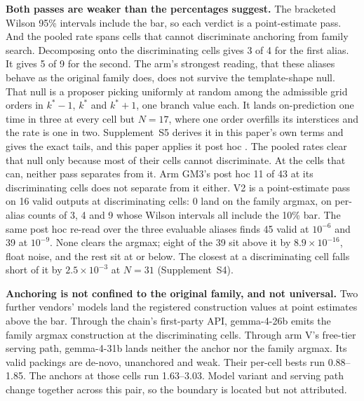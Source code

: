 

\textbf{Both passes are weaker than the percentages suggest.} The
bracketed Wilson 95\% intervals include the bar, so each verdict is a point-estimate pass.
And the pooled rate spans cells that cannot
discriminate anchoring from family search. Decomposing onto the discriminating cells gives 3
of 4 for the first alias. It gives 5 of 9 for the second. The arm's strongest reading, that these aliases behave
as the original family does, does not survive the template-shape null. That null is a proposer
picking uniformly at random among the admissible grid orders in $k^*{-}1$, $k^*$ and $k^*{+}1$,
one branch value each. It lands on-prediction one time in three at every cell but $N = 17$,
where one order overfills its interstices and the rate is one in two. Supplement~S5 derives it in
this paper's own terms and gives the exact tails, and this paper applies it post hoc
\citep{companion}. The pooled rates clear that null only because most of their cells cannot
discriminate. At the cells that can, neither pass separates from it. Arm GM3's
post hoc 11 of 43 at its discriminating cells does not separate from it either. V2 is a point-estimate
pass on 16 valid outputs at discriminating cells: 0 land on the family argmax, on per-alias
counts of 3, 4 and 9 whose Wilson intervals all include the 10\% bar. The same post hoc re-read over the three evaluable aliases
finds 45 valid at $10^{-6}$ and 39 at $10^{-9}$. None clears the argmax; eight of the 39
sit above it by $8.9\times10^{-16}$, float noise, and the rest sit at or below. The closest at
a discriminating cell
falls short of it by $2.5\times10^{-3}$ at $N = 31$ (Supplement~S4).

\textbf{Anchoring is not confined to the original family, and not universal.} Two further
vendors' models land the registered construction values at point estimates above the bar.
Through the chain's first-party API, gemma-4-26b emits the family argmax construction at
the discriminating cells. Through arm V's free-tier serving path, gemma-4-31b lands neither the
anchor nor the family argmax. Its valid packings are de-novo, unanchored and weak. Their per-cell bests run
0.88--1.85. The anchors at those cells run 1.63--3.03. Model variant and serving path
change together across this pair, so the boundary is located but not attributed.
